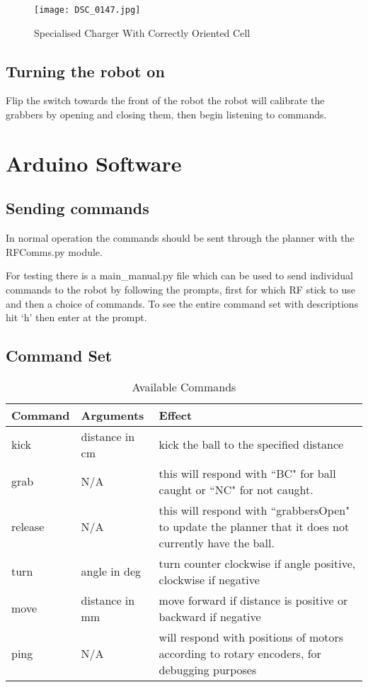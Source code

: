 \begin{figure}[H]
\caption{Specialised Charger With Correctly Oriented Cell}
\centering
\texttt{[image: DSC\_0147.jpg]}
\label{fig:charger}
\end{figure}


\subsection{Turning the robot on}
Flip the switch towards the front of the robot the robot will calibrate the grabbers by opening and closing them, then begin listening to commands.

\section{Arduino Software}
\subsection{Sending commands}
In normal operation the commands should be sent through the planner with the RFComms.py module. 

For testing there is a main\_manual.py file which can be used to send individual commands to the robot by following the 
prompts, first for which RF stick to use and then a choice of commands. To see the entire command set  with descriptions hit `h' then enter at the prompt. 

\subsection{Command Set}
\begin{table}[H]
\begin{tabularx}{\textwidth}{ llX }
\toprule
\textbf{Command} & \textbf{Arguments} & \textbf{Effect} \\
\midrule
kick & distance in cm & kick the ball to the specified distance\\
grab & N/A & this will respond with ``BC" for ball caught or ``NC" for not caught. \\
release & N/A & this will respond with ``grabbersOpen" to update the planner that it does not currently have the ball. \\
turn & angle in deg & turn counter clockwise if angle positive, clockwise if negative\\
move & distance in mm & move forward if distance is positive or backward if negative \\
ping & N/A &  will respond with positions of motors according to rotary encoders, for debugging purposes \\
\bottomrule
\end{tabularx}
\caption{Available Commands}
\end{table}

